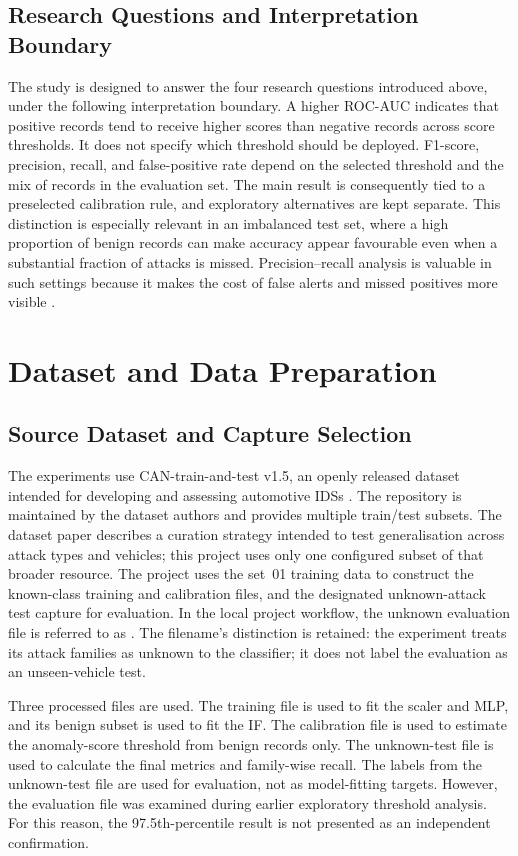 \documentclass[journal]{IEEEtran}
\begin{document}
\subsection{Research Questions and Interpretation Boundary}
The study is designed to answer the four research questions introduced above, under the following interpretation boundary. A higher ROC-AUC indicates that positive records tend to receive higher scores than negative records across score thresholds. It does not specify which threshold should be deployed. F1-score, precision, recall, and false-positive rate depend on the selected threshold and the mix of records in the evaluation set. The main result is consequently tied to a preselected calibration rule, and exploratory alternatives are kept separate. This distinction is especially relevant in an imbalanced test set, where a high proportion of benign records can make accuracy appear favourable even when a substantial fraction of attacks is missed. Precision--recall analysis is valuable in such settings because it makes the cost of false alerts and missed positives more visible \cite{davis2006prroc}.

\section{Dataset and Data Preparation}
\subsection{Source Dataset and Capture Selection}
The experiments use CAN-train-and-test v1.5, an openly released dataset intended for developing and assessing automotive IDSs \cite{lampe2024dataset,cantrainrepo}. The repository is maintained by the dataset authors and provides multiple train/test subsets. The dataset paper describes a curation strategy intended to test generalisation across attack types and vehicles; this project uses only one configured subset of that broader resource. The project uses the set~01 training data to construct the known-class training and calibration files, and the designated unknown-attack test capture for evaluation. In the local project workflow, the unknown evaluation file is referred to as . The filename's distinction is retained: the experiment treats its attack families as unknown to the classifier; it does not label the evaluation as an unseen-vehicle test.

Three processed files are used. The training file is used to fit the scaler and MLP, and its benign subset is used to fit the IF. The calibration file is used to estimate the anomaly-score threshold from benign records only. The unknown-test file is used to calculate the final metrics and family-wise recall. The labels from the unknown-test file are used for evaluation, not as model-fitting targets. However, the evaluation file was examined during earlier exploratory threshold analysis. For this reason, the 97.5th-percentile result is not presented as an independent confirmation.
\end{document}
